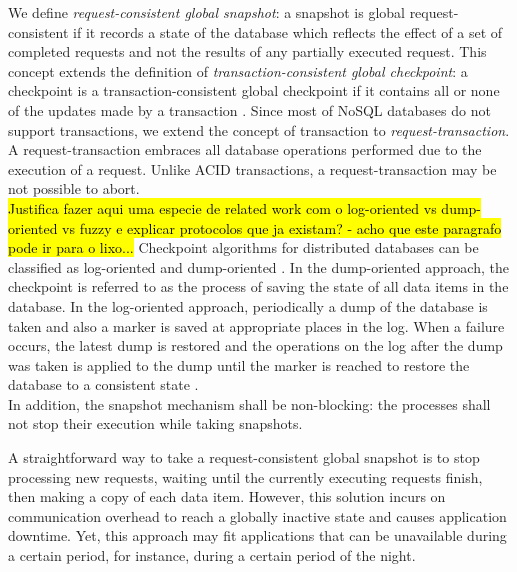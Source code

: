 We define \textit{request-consistent global snapshot}: a snapshot is global request-consistent if it records a state of the database which reflects the effect of a set of completed requests and not the results of any partially executed request. This concept extends the definition of \emph{transaction-consistent global checkpoint}: a checkpoint is a transaction-consistent global checkpoint if it contains all or none of the updates made by a transaction \cite{global-checkpoint}. Since most of \acs{NoSQL} databases do not support transactions, we extend the concept of transaction to \textit{request-transaction}. A request-transaction embraces all database operations performed due to the execution of a request. Unlike \ac{ACID} transactions, a request-transaction may be not possible to abort.\\ 



\hl{Justifica fazer aqui uma especie de related work com o log-oriented vs dump-oriented vs fuzzy e explicar protocolos que ja existam? - acho que este paragrafo pode ir para o lixo...} Checkpoint algorithms for distributed databases can be classified as log-oriented and dump-oriented \cite{checkpoint-survey}. In the dump-oriented approach, the checkpoint is referred to as the process of saving the state of all data items in the database. In the log-oriented approach, periodically a dump of the database is taken and also a marker is saved at appropriate places in the log. When a failure occurs, the latest dump is restored and the operations on the log after the dump was taken is applied to the dump until the marker is reached to restore the database to a consistent state \cite{global-checkpoint}.\\


In addition, the snapshot mechanism shall be non-blocking: the processes shall not stop their execution while taking snapshots.  

A straightforward way to take a request-consistent global snapshot is to stop processing new requests, waiting until the currently executing requests finish, then making a copy of each data item. However, this solution incurs on communication overhead to reach a globally inactive state and causes application downtime. Yet, this approach may fit applications that can be unavailable during a certain period, for instance, during a certain period of the night. \\


